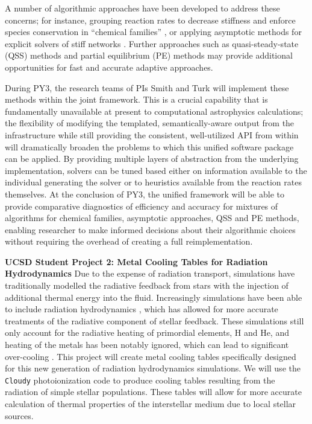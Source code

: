 A number of algorithmic approaches have been developed to address these concerns;
for instance, grouping reaction rates to decrease stiffness and enforce species
conservation in ``chemical families''
\citep{doi:10.1002/kin.550100907, SANDU19973151}, or applying 
asymptotic methods for explicit solvers of stiff networks
\citep{1749-4699-6-1-015001}.  Further approaches such as 
quasi-steady-state (QSS) methods \citep{1749-4699-6-1-015002} and 
partial equilibrium (PE) methods \citep{1749-4699-6-1-015003} may provide
additional opportunities for fast and accurate adaptive approaches.

During PY3, the research teams of PIs Smith and Turk will implement these
methods within the joint framework.  This is a crucial capability that is
fundamentally unavailable at present to computational astrophysics
calculations; the flexibility of modifying the templated, semantically-aware
output from the \dengo{} infrastructure while still providing the consistent,
well-utilized API from within \grackle{} will dramatically broaden the problems
to which this unified software package can be applied.  By providing multiple
layers of abstraction from the underlying implementation, solvers can be tuned
based either on information available to the individual generating the solver
or to heuristics available from the reaction rates themselves.  At the
conclusion of PY3, the unified framework will be able to provide comparative
diagnostics of efficiency and accuracy for mixtures of algorithms for chemical
families, asymptotic approaches, QSS and PE methods, enabling researcher to
make informed decisions about their algorithmic choices without requiring the
overhead of creating a full reimplementation.

\noindent \textbf{UCSD Student Project 2: Metal Cooling
  Tables for Radiation Hydrodynamics}
Due to the expense of radiation transport, simulations have
traditionally modelled the radiative feedback from stars with the
injection of additional thermal energy into the fluid.  Increasingly
simulations have been able to include radiation
hydrodynamics \citep{2012MNRAS.427..311W, Xu_2013, Wise_2014,
2015ApJ...807L..12O}, which has allowed for more accurate treatments of the
radiative component of stellar feedback.  These simulations
still only account for the radiative heating of primordial elements, H
and He, and heating of the metals has been notably ignored, which can
lead to significant over-cooling \citep{2011MNRAS.413..190T,
  2012MNRAS.427..311W}.  This project will create
metal cooling tables specifically designed for this new generation of
radiation hydrodynamics simulations.  We will use the \texttt{Cloudy}
photoionization code to produce cooling tables resulting from the
radiation of simple stellar populations.  These tables will allow for
more accurate calculation of thermal properties of the interstellar
medium due to local stellar sources.

